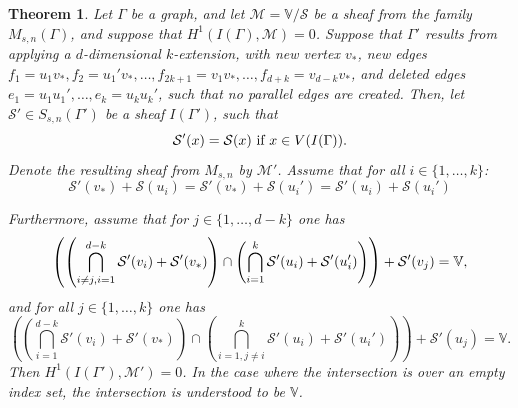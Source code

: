 \documentclass{article}
\newtheorem{theorem}{Theorem}[section]
\theoremstyle{definition}
\theoremstyle{remark}
\begin{document}
\begin{theorem}\label{thm: k-extension}
Let $\Gamma$ be a graph, and let $\mathcal{M} = \mathbb{V}/\mathcal{S}$ be a sheaf from the family $M_{s,n}(\Gamma)$, and suppose that $H^{1}(I(\Gamma), \mathcal{M}) = 0$.
Suppose that $\Gamma'$ results from applying a $d$-dimensional $k$-extension, with new vertex $v_{*}$, new edges $f_{1} =u_{1}v_{*}, f_{2}=u_{1}'v_{*},\dots, f_{2k +1}=v_{1}v_*, \dots, f_{d+k}=v_{d-k}v_*$,  and deleted edges $e_1=u_1u_1',\dots, e_k=u_ku_k'$, such that no parallel edges are created. Then, let $\mathcal{S}'\in S_{s,n}(\Gamma')$ be a sheaf $I(\Gamma')$, such that
\begin{equation*}
\mathcal{S'}(x) =\mathcal{S}(x) \textup{ if $x\in V(I(\Gamma))$}.
\end{equation*}
Denote the resulting sheaf from $M_{s,n}$ by $\mathcal{M'}$.
Assume that for all $i \in \{1, \dots, k\}$:
\begin{equation}\label{eq: vertex v and ei}
    \mathcal{S'}(v_*)  + \mathcal{S}(u_i)=\mathcal{S'}(v_*)  + \mathcal{S}(u_i') = \mathcal{S'}(u_i)  + \mathcal{S}(u_i')
\end{equation}

Furthermore, assume that for $j \in \{1, \dots, d-k\}$ one has
\begin{equation} \label{eq: Algebraic_condition_ext1}
\left( \left( \bigcap_{i \neq j,\\ i=1}^{d-k}\mathcal{S}'(v_i) + \mathcal{S}'(v_*)\right) \cap \left( \bigcap_{i=1}^{k}\mathcal{S}'(u_i) + \mathcal{S}'(u_i') \right)\right) + \mathcal{S}'(v_j)  = \mathbb{V},
\end{equation}
and for all $j \in \{1, \dots, k\}$ one has
\begin{equation} \label{eq: Algebraic_condition_ext2}
\left( \left( \bigcap_{i=1}^{d-k}\mathcal{S}'(v_i) + \mathcal{S}'(v_*)\right) \cap \left( \bigcap_{i=1, j \neq i}^{k}\mathcal{S}'(u_i) + \mathcal{S}'(u_i') \right)\right) + \mathcal{S}'(u_j)  = \mathbb{V}.
\end{equation}
Then $H^{1}(I(\Gamma'), \mathcal{M}')  = 0$. In the case where the intersection is over an empty index set, the intersection is understood to be $\mathbb{V}$.
\end{theorem}
\end{document}
